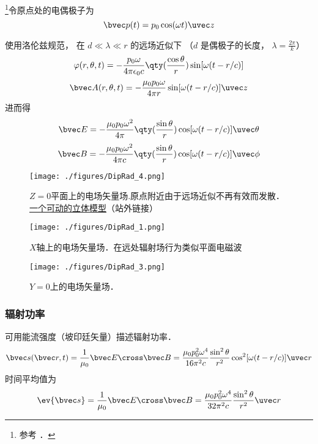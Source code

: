 
\begin{issues}
\issueDraft
\end{issues}


\footnote{参考 \cite{GriffE}．}令原点处的电偶极子为
\begin{equation}
\bvec p(t) = p_0 \cos(\omega t) \uvec z
\end{equation}

使用洛伦兹规范， 在 $d \ll \lambda \ll r$ 的远场近似下 （$d$ 是偶极子的长度， $\lambda = \frac{2\pi}{k}$）
\begin{equation}
\varphi(r, \theta, t) = -\frac{p_0\omega}{4\pi\epsilon_0 c} \qty(\frac{\cos\theta}{r}) \sin[\omega(t - r/c)]
\end{equation}
\begin{equation}
\bvec A(r, \theta, t) = -\frac{\mu_0 p_0 \omega}{4\pi r} \sin[\omega(t - r/c)]\uvec z
\end{equation}
进而得
\begin{equation}
\bvec E = -\frac{\mu_0 p_0\omega^2}{4\pi} \qty(\frac{\sin\theta}{r})\cos[\omega(t - r/c)]\uvec \theta
\end{equation}
\begin{equation}
\bvec B = -\frac{\mu_0 p_0\omega^2}{4\pi c} \qty(\frac{\sin\theta}{r})\cos[\omega(t - r/c)]\uvec \phi
\end{equation}

\begin{figure}[ht]
\centering
\texttt{[image: ./figures/DipRad\_4.png]}
\caption{$Z=0$平面上的电场矢量场.原点附近由于远场近似不再有效而发散．\href{https://www.geogebra.org/m/xnputtwr}{一个可动的立体模型}（站外链接）} \label{DipRad_fig4}
\end{figure}

\begin{figure}[ht]
\centering
\texttt{[image: ./figures/DipRad\_1.png]}
\caption{$X$轴上的电场矢量场．在远处辐射场行为类似平面电磁波 } \label{DipRad_fig1}
\end{figure}


\begin{figure}[ht]
\centering
\texttt{[image: ./figures/DipRad\_3.png]}
\caption{$Y=0$上的电场矢量场．} \label{DipRad_fig3}
\end{figure}

\subsubsection{辐射功率}
可用能流强度（坡印廷矢量）描述辐射功率．
\begin{equation}
\bvec s(\bvec r, t) = \frac{1}{\mu_0} \bvec E \cross \bvec B = \frac{\mu_0p_0^2\omega^4}{16\pi^2c} \frac{\sin^2\theta}{r^2} \cos^2[\omega(t - r/c)] \uvec r
\end{equation}
时间平均值为
\begin{equation}
\ev{\bvec s} = \frac{1}{\mu_0} \bvec E \cross \bvec B
= \frac{\mu_0p_0^2\omega^4}{32\pi^2c} \frac{\sin^2\theta}{r^2} \uvec r
\end{equation}

